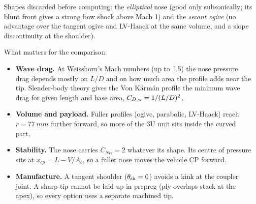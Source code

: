 Shapes discarded before computing: the \emph{elliptical} nose (good only subsonically; its blunt
front gives a strong bow shock above Mach 1) and the \emph{secant ogive} (no advantage over the
tangent ogive and LV-Haack at the same volume, and a slope discontinuity at the shoulder).

What matters for the comparison:
\begin{itemize}[leftmargin=*,itemsep=2pt]
\item \textbf{Wave drag.} At Weisshorn's Mach numbers (up to 1.5) the nose pressure drag
depends mostly on $L/D$ and on how much area the profile adds near the tip. Slender-body theory
gives the Von K\'arm\'an profile the minimum wave drag for given length and base area,
$C_{D,\rm w} = 1/(L/D)^2$.
\item \textbf{Volume and payload.} Fuller profiles (ogive, parabolic, LV-Haack) reach
$r=\SI{77}{mm}$ further forward, so more of the 3U unit sits inside the curved part.
\item \textbf{Stability.} The nose carries $C_{N\alpha}=2$ whatever its shape. Its centre of
pressure sits at $x_{cp}=L-V/A_b$, so a fuller nose moves the vehicle CP forward.
\item \textbf{Manufacture.} A tangent shoulder ($\theta_{\rm sh}=0$) avoids a kink at the coupler
joint. A sharp tip cannot be laid up in prepreg (ply overlaps stack at the apex), so every option
uses a separate machined tip.
\end{itemize}
